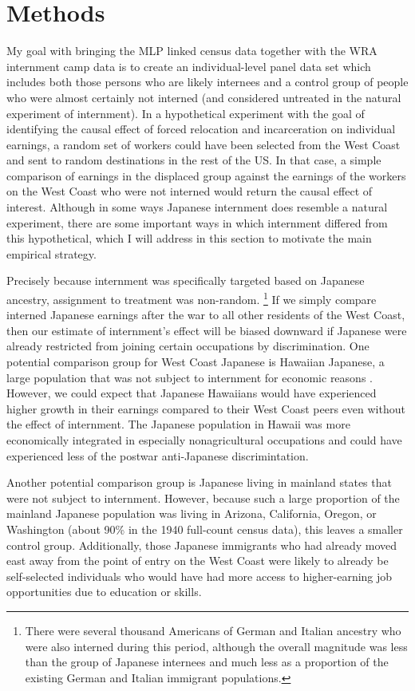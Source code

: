 \section{Methods}\label{sec:methods}

My goal with bringing the MLP linked census data
together with the WRA internment camp data
is to create an individual-level panel data set
which includes both those persons who are likely internees
and a control group of people who were almost certainly not interned
(and considered untreated in the natural experiment of internment).
In a hypothetical experiment with the goal of identifying the causal effect
of forced relocation and incarceration on individual earnings,
a random set of workers could have been selected from the West Coast
and sent to random destinations in the rest of the US.
In that case, a simple comparison of earnings in the displaced group
against the earnings of the workers on the West Coast who were not interned
would return the causal effect of interest.
Although in some ways Japanese internment does resemble a natural experiment,
there are some important ways in which internment differed from this hypothetical,
which I will address in this section to motivate the main empirical strategy.

Precisely because internment was specifically targeted based on Japanese ancestry,
assignment to treatment was non-random.
\footnote{
  There were several thousand Americans of German and Italian ancestry 
  who were also interned during this period,
  although the overall magnitude was less than the group of Japanese internees
  and much less as a proportion of the existing German and Italian immigrant 
  populations.
  }
If we simply compare interned Japanese earnings after the war
to all other residents of the West Coast,
then our estimate of internment's effect
will be biased downward if Japanese were already restricted from
joining certain occupations by discrimination.
One potential comparison group for  West Coast Japanese is Hawaiian Japanese,
a large population that was not subject to internment
for economic reasons \citep{chinLongRunLaborMarket2005}.
However, we could expect that Japanese Hawaiians
would have experienced higher growth in their earnings
compared to their West Coast peers even without the effect of internment.
The Japanese population in Hawaii was more economically integrated
in especially nonagricultural occupations
and could have experienced less of the postwar anti-Japanese discrimintation.

Another potential comparison group is Japanese living in mainland states 
that were not subject to internment.
However, because such a large proportion of the mainland Japanese population
was living in Arizona, California, Oregon, or Washington
(about 90\% in the 1940 full-count census data),
this leaves a smaller control group.
Additionally, those Japanese immigrants who had already moved east away
from the point of entry on the West Coast
were likely to already be self-selected individuals
who would have had more access to higher-earning job opportunities
due to education or skills.

